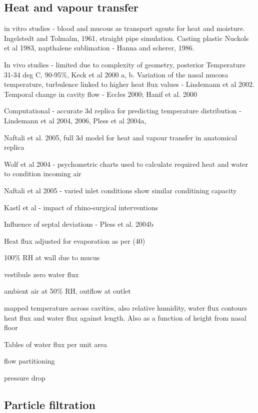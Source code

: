 \documentclass{article}
\begin{document}
\subsection{Heat and vapour transfer}

\cite{Elad2008}

in vitro studies - blood and mucous as transport agents for heat and moisture. Ingelstedt and Tolmalm, 1961, straight pipe simulation. Casting plastic Nuckols et al 1983, napthalene sublimation - Hanna and scherer, 1986. 

In vivo studies - limited due to complexity of geometry, posterior Temperature 31-34 deg C, 90-95\%, Keck et al 2000 a, b. Variation of the nasal mucosa temperature, turbulence linked to higher heat flux values - Lindemann et al 2002. Temporal change in cavity flow - Eccles 2000; Hanif et al. 2000

Computational - accurate 3d replica for predicting temperature distribution - Lindemann et al 2004, 2006, Pless et al 2004a, 

Naftali et al. 2005, full 3d model for heat and vapour transfer in anatomical replica

Wolf et al 2004 - psychometric charts used to calculate required heat and water to condition incoming air

Naftali et al 2005 - varied inlet conditions show similar conditining capacity

Kastl et al - impact of rhino-surgical interventions

Influence of septal deviations - Pless et al. 2004b


\cite{Garcia2007}

Heat flux adjusted for evaporation as per (40)

100\% RH at wall due to mucus

vestibule zero water flux

ambient air at 50\% RH, outflow at outlet

mapped temperature across cavities, also relative humidity, water flux contours
heat flux and water flux against length. Also as a function of height from nasal floor

Tables of water flux per unit area

flow partitioning

pressure drop



\subsection{Particle filtration}
\end{document}
